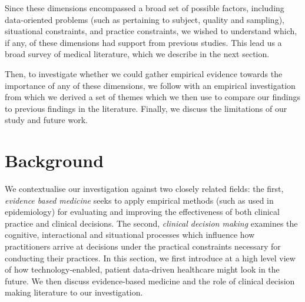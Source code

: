 \documentclass{sigchi}
\begin{document}
Since these dimensions encompassed a broad set of possible factors, including data-oriented problems (such as pertaining to subject, quality and sampling), situational constraints, and practice constraints, we wished to understand which, if any, of these dimensions had support from previous studies.  This lead us a broad survey of medical literature, which we describe in the next section.  

Then, to investigate whether we could gather empirical evidence towards the importance of any of these dimensions, we follow with an empirical investigation from which we derived a set of themes which we then use to compare our findings to previous findings in the literature.  Finally, we discuss the limitations of our study and future work.






\section{Background} 

We contextualise our investigation against two closely related fields: the first, \emph{evidence based medicine} seeks to apply empirical methods (such as used in epidemiology) for evaluating and improving the effectiveness of both clinical practice and clinical decisions.  The second, \emph{clinical decision making} examines the cognitive, interactional and situational processes which influence how practitioners arrive at decisions under the practical constraints necessary for conducting their practices.  In this section, we first introduce at a high level view of how technology-enabled, patient data-driven healthcare might look in the future.  We then discuss evidence-based medicine and the role of clinical decision making literature to our investigation.
\end{document}
